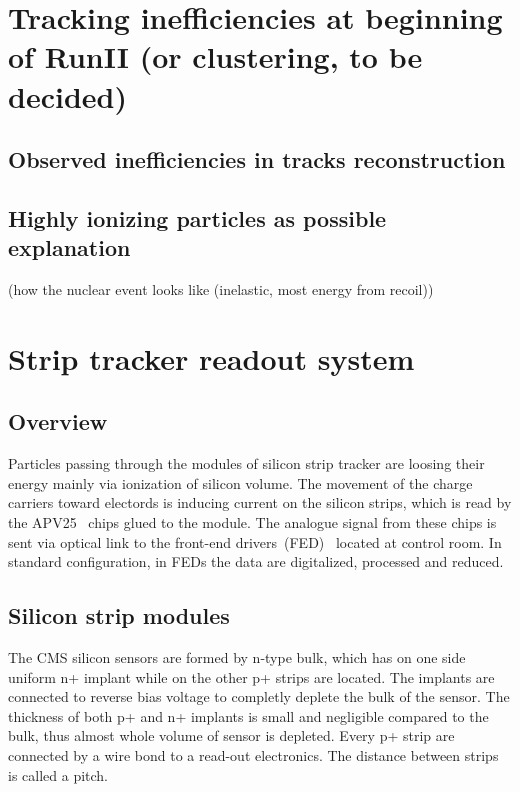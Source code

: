 
\section{Tracking inefficiencies at beginning of RunII (or clustering, to be decided)}

\subsection{Observed inefficiencies in tracks reconstruction}
\subsection{Highly ionizing particles as possible explanation}
        (how the nuclear event looks like (inelastic, most energy from recoil))


\section{Strip tracker readout system}

\subsection{Overview}

Particles passing through the modules of silicon strip tracker are loosing their energy mainly via ionization of silicon volume. The movement of the charge carriers toward electords is inducing current on the silicon strips, which is read by the APV25~\cite{French:2001xb} chips glued to the module. The analogue signal from these chips is sent via optical link to the front-end drivers~(FED)~\cite{Baird:2002wg} located at control room. In standard configuration, in FEDs the data are digitalized, processed and reduced. 

\subsection{Silicon strip modules}

The CMS silicon sensors are formed by n-type bulk, which has on one side uniform n+ implant while on the other p+ strips are located. The implants are connected to reverse bias voltage to completly deplete the bulk of the sensor. The thickness of both p+ and n+ implants is small and negligible compared to the bulk, thus almost whole volume of sensor is depleted. Every p+ strip are connected by a wire bond to a read-out electronics. The distance between strips is called a pitch.


